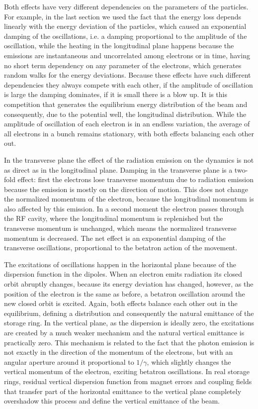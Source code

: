     Both effects have very different dependencies on the parameters of the particles. For example, in the last section we used the fact that the energy loss depends linearly with the energy deviation of the particles, which caused an exponential damping of the oscillations, i.e. a damping proportional to the amplitude of the oscillation, while the heating in the longitudinal plane happens because the emissions are instantaneous and uncorrelated among electrons or in time, having no short term dependency on any parameter of the electrons, which generates random walks for the energy deviations. Because these effects have such different dependencies they always compete with each other, if the amplitude of oscillation is large the damping dominates, if it is small there is a blow up. It is this competition that generates the equilibrium energy distribution of the beam and consequently, due to the potential well, the longitudinal distribution. While the amplitude of oscillation of each electron is in an endless variation, the average of all electrons in a bunch remains stationary, with both effects balancing each other out.

    In the transverse plane the effect of the radiation emission on the dynamics is not as direct as in the longitudinal plane. Damping in the transverse plane is a two-fold effect: first the electrons lose transverse momentum due to radiation emission because the emission is mostly on the direction of motion. This does not change the normalized momentum of the electron, because the longitudinal momentum is also affected by this emission. In a second moment the electron passes through the RF cavity, where the longitudinal momentum is replenished but the transverse momentum is unchanged, which means the normalized transverse momentum is decreased. The net effect is an exponential damping of the transverse oscillations, proportional to the betatron action of the movement.

    The excitations of oscillations happen in the horizontal plane because of the dispersion function in the dipoles. When an electron emits radiation its closed orbit abruptly changes, because its energy deviation has changed, however, as the position of the electron is the same as before, a betatron oscillation around the new closed orbit is excited. Again, both effects balance each other out in the equilibrium, defining a distribution and consequently the natural emittance of the storage ring. In the vertical plane, as the dispersion is ideally zero, the excitations are created by a much weaker mechanism and the natural vertical emittance is practically zero. This mechanism is related to the fact that the photon emission is not exactly in the direction of the momentum of the electrons, but with an angular aperture around it proportional to $1/\gamma$, which slightly changes the vertical momentum of the electron, exciting betatron oscillations. In real storage rings, residual vertical dispersion function from magnet errors and coupling fields that transfer part of the horizontal emittance to the vertical plane completely overshadow this process and define the vertical emittance of the beam.

